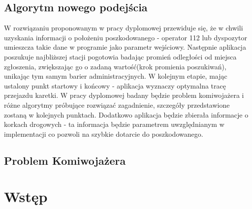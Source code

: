 \documentclass[12pt]{article} %
\begin{document}
\subsection{Algorytm nowego podejścia}
W rozwiązaniu proponowanym w pracy dyplomowej przewiduje się, że w chwili uzyskania informacji o położeniu poszkodowanego - operator 112 lub dyspozytor umieszcza takie dane w programie jako parametr wejściowy. Następnie aplikacja poszukuje najbliższej stacji pogotowia   badając promień odległości od miejsca zgłoszenia, zwiększając go o zadaną wartość(krok promienia poszukiwań), unikając tym samym barier administracyjnych. W kolejnym etapie, mając ustalony punkt startowy i końcowy - aplikacja wyznaczy optymalna tracę przejazdu karetki. W pracy dyplomowej badany będzie problem komiwojażera i różne algorytmy próbujące rozwiązać zagadnienie, szczegóły przedstawione zostaną w kolejnych punktach. Dodatkowo aplikacja będzie zbierała informacje o korkach drogowych - ta informacja będzie parametrem uwzględnianym w implementacji co pozwoli  na szybkie dotarcie do poszkodowanego.

\subsection{Problem Komiwojażera}




\section{Wstęp}



\newpage
\end{document}
